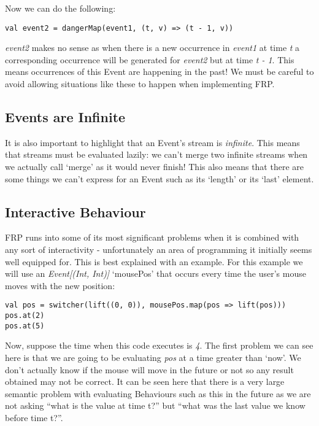       Now we can do the following:
      
\begin{verbatim}
val event2 = dangerMap(event1, (t, v) => (t - 1, v))
\end{verbatim}

      \emph{event2} makes no sense as when there is a new occurrence in \emph{event1} at time 
      \emph{t} a corresponding occurrence will be generated for \emph{event2} but at time 
      \emph{t - 1}. This means occurrences of this Event are happening in the past! We must
      be careful to avoid allowing situations like these to happen when implementing FRP.
      
    \subsection{Events are Infinite}  
      It is also important to highlight that an Event's stream is \emph{infinite}. This means
      that streams must be evaluated lazily: we can't merge two infinite streams when we actually
      call `merge' as it would never finish! This also means that there are some things we
      can't express for an Event such as its `length' or its `last' element.
    
      
    \subsection{Interactive Behaviour}
      FRP runs into some of its most significant problems when it is combined with any
      sort of interactivity - unfortunately an area of programming it initially seems
      well equipped for. This is best explained with an example. For this example we will use an 
      \emph{Event[(Int, Int)]} `mousePos' that occurs every time the user's mouse moves with the new position:

\begin{verbatim}
val pos = switcher(lift((0, 0)), mousePos.map(pos => lift(pos)))
pos.at(2)
pos.at(5)
\end{verbatim}    

      Now, suppose the time when this code executes is \emph{4}. The first problem we can see here
      is that we are going to be evaluating \emph{pos} at a time greater than `now'. We don't
      actually know if the mouse will move in the future or not so any result obtained may not
      be correct. It can be seen here that there is a very large semantic problem with evaluating
      Behaviours such as this in the future as we are not asking ``what is the value at time t?''
      but ``what was the last value we know before time t?''. 
      
